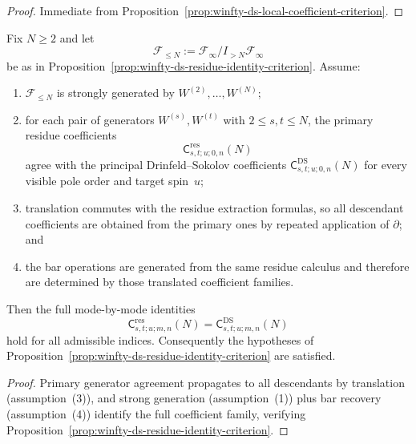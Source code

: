 \begin{proof}
Immediate from Proposition~\ref{prop:winfty-ds-local-coefficient-criterion}.
\end{proof}

\begin{proposition}
\label{prop:winfty-ds-generator-seed}
Fix $N \ge 2$ and let
\[
\mathcal{F}_{\le N}:=\mathcal{F}_\infty/I_{>N}\mathcal{F}_\infty
\]
be as in
Proposition~\ref{prop:winfty-ds-residue-identity-criterion}.  Assume:
\begin{enumerate}
\item $\mathcal{F}_{\le N}$ is strongly generated by
  $W^{(2)},\dots,W^{(N)}$;
\item for each pair of generators $W^{(s)},W^{(t)}$ with
  $2 \le s,t \le N$, the primary residue coefficients
  \[
  \mathsf{C}^{\mathrm{res}}_{s,t;u;0,n}(N)
  \]
  agree with the principal Drinfeld--Sokolov coefficients
  $\mathsf{C}^{\mathrm{DS}}_{s,t;u;0,n}(N)$ for every visible pole order
  and target spin~$u$;
\item translation commutes with the residue extraction formulas, so all
  descendant coefficients are obtained from the primary ones by
  repeated application of $\partial$; and
\item the bar operations are generated from the same residue calculus
  and therefore are determined by those translated coefficient
  families.
\end{enumerate}
Then the full mode-by-mode identities
\[
\mathsf{C}^{\mathrm{res}}_{s,t;u;m,n}(N)
=\mathsf{C}^{\mathrm{DS}}_{s,t;u;m,n}(N)
\]
hold for all admissible indices.  Consequently the hypotheses of
Proposition~\ref{prop:winfty-ds-residue-identity-criterion} are
satisfied.
\end{proposition}

\begin{proof}
Primary generator agreement propagates to all descendants by translation (assumption~(3)), and strong generation (assumption~(1)) plus bar recovery (assumption~(4)) identify the full coefficient family, verifying Proposition~\ref{prop:winfty-ds-residue-identity-criterion}.
\end{proof}

